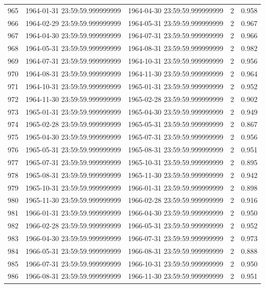 \begin{table}
\begin{tabular}{lcccc}
965 & 1964-01-31 23:59:59.999999999 & 1964-04-30 23:59:59.999999999 & 2 & 0.958 \\
966 & 1964-02-29 23:59:59.999999999 & 1964-05-31 23:59:59.999999999 & 2 & 0.967 \\
967 & 1964-04-30 23:59:59.999999999 & 1964-07-31 23:59:59.999999999 & 2 & 0.966 \\
968 & 1964-05-31 23:59:59.999999999 & 1964-08-31 23:59:59.999999999 & 2 & 0.982 \\
969 & 1964-07-31 23:59:59.999999999 & 1964-10-31 23:59:59.999999999 & 2 & 0.956 \\
970 & 1964-08-31 23:59:59.999999999 & 1964-11-30 23:59:59.999999999 & 2 & 0.964 \\
971 & 1964-10-31 23:59:59.999999999 & 1965-01-31 23:59:59.999999999 & 2 & 0.952 \\
972 & 1964-11-30 23:59:59.999999999 & 1965-02-28 23:59:59.999999999 & 2 & 0.902 \\
973 & 1965-01-31 23:59:59.999999999 & 1965-04-30 23:59:59.999999999 & 2 & 0.949 \\
974 & 1965-02-28 23:59:59.999999999 & 1965-05-31 23:59:59.999999999 & 2 & 0.867 \\
975 & 1965-04-30 23:59:59.999999999 & 1965-07-31 23:59:59.999999999 & 2 & 0.956 \\
976 & 1965-05-31 23:59:59.999999999 & 1965-08-31 23:59:59.999999999 & 2 & 0.951 \\
977 & 1965-07-31 23:59:59.999999999 & 1965-10-31 23:59:59.999999999 & 2 & 0.895 \\
978 & 1965-08-31 23:59:59.999999999 & 1965-11-30 23:59:59.999999999 & 2 & 0.942 \\
979 & 1965-10-31 23:59:59.999999999 & 1966-01-31 23:59:59.999999999 & 2 & 0.898 \\
980 & 1965-11-30 23:59:59.999999999 & 1966-02-28 23:59:59.999999999 & 2 & 0.916 \\
981 & 1966-01-31 23:59:59.999999999 & 1966-04-30 23:59:59.999999999 & 2 & 0.950 \\
982 & 1966-02-28 23:59:59.999999999 & 1966-05-31 23:59:59.999999999 & 2 & 0.952 \\
983 & 1966-04-30 23:59:59.999999999 & 1966-07-31 23:59:59.999999999 & 2 & 0.973 \\
984 & 1966-05-31 23:59:59.999999999 & 1966-08-31 23:59:59.999999999 & 2 & 0.888 \\
985 & 1966-07-31 23:59:59.999999999 & 1966-10-31 23:59:59.999999999 & 2 & 0.950 \\
986 & 1966-08-31 23:59:59.999999999 & 1966-11-30 23:59:59.999999999 & 2 & 0.951 \\

\end{tabular}
\end{table}
